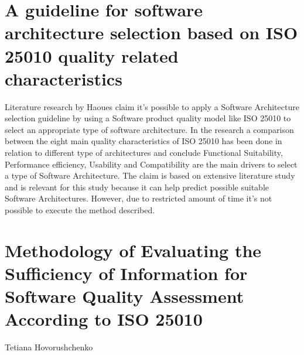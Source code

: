 \section*{A guideline for software architecture selection based on ISO 25010 quality related characteristics}
Literature research by Haoues \etal \cite{Haoues2017AGF} claim it's possible to apply a Software Architecture selection guideline by using a Software product quality model like ISO 25010 to select an appropriate type of software architecture. In the research a comparison between the eight main quality characteristics of ISO 25010 has been done in relation to different type of architectures and conclude Functional Suitability, Performance efficiency, Usability and Compatibility are the main drivers to select a type of Software Architecture. The claim is based on extensive literature study and is relevant for this study because it can help predict possible suitable Software Architectures. However, due to restricted amount of time it's not possible to execute the method described. 

\section*{Methodology of Evaluating the Sufficiency of Information for Software Quality Assessment According to ISO 25010}

Tetiana Hovorushchenko \cite{Hovorushchenko2018MethodologyOE}
